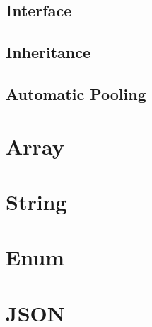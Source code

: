 \documentclass[12pt,letterpaper]{report}
\begin{document}
\subsection{Interface}\label{Interface}
\subsection{Inheritance}\label{Inheritance}
\subsection{Automatic Pooling}\label{Automatic Pooling}
\section{Array}\label{Array}
\section{String}\label{String}
\section{Enum}\label{Enum}
\section{JSON}\label{JSON}
\end{document}
